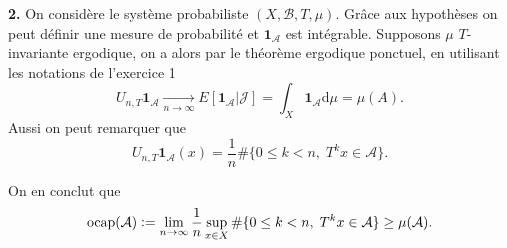 \documentclass[12pt]{article}
\newcommand{\defeq}{\vcentcolon=}
\newcommand{\de}{\mathrm{d}}
\begin{document}
\bigskip

\textbf{2.} On considère le système probabiliste $(X, \mathcal{B}, T, \mu)$. Grâce aux hypothèses on peut définir une mesure de probabilité et $\mathbf{1}_{\mathcal{A}}$ est intégrable. Supposons $\mu$ $T$-invariante ergodique, on a alors par le théorème ergodique ponctuel, en utilisant les notations de l'exercice 1 \[
        U_{n, T}\mathbf{1}_{\mathcal{A}} \underset{n \to \infty}{\to} E[\mathbf{1}_{\mathcal{A}}|\mathcal{J}] = \int_{X}\mathbf{1}_{\mathcal{A}} \de\mu = \mu(A)
.\] Aussi on peut remarquer que \[
 U_{n, T}\mathbf{1}_{\mathcal{A}}(x) = \frac{1}{n}\#\{0\le k < n, \; T^{k}x \in \mathcal{A}\}
.\] 

On en conclut que \[
        \mathrm{ocap}(\mathcal{A}) \defeq \lim_{n\to \infty} \frac{1}{n}\sup_{x \in X}\#\{0\le k < n, \; T^{k}x \in \mathcal{A}\} \ge \mu(\mathcal{A})
.\] 
\end{document}
